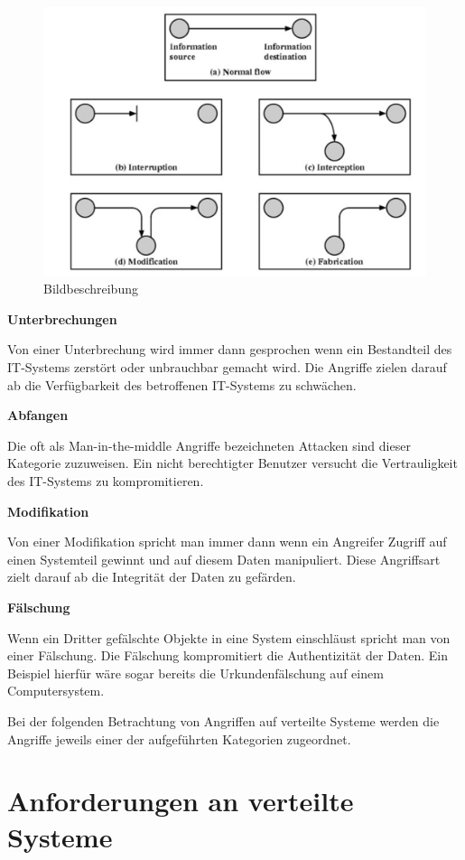 \begin{figure}[H]
    \centering
    \includegraphics[width=\textwidth]{images/angriffe_pic1.png}
    \caption[Beschriebung für Inhaltsverzeichnis]{Bildbeschreibung} 
    \label{Referenz}
\end{figure} 

\textbf{Unterbrechungen}

Von einer Unterbrechung wird immer dann gesprochen wenn ein Bestandteil des 
IT-Systems zerstört oder unbrauchbar gemacht wird. Die Angriffe zielen darauf 
ab die Verfügbarkeit des betroffenen IT-Systems zu schwächen. 

\textbf{Abfangen}

Die oft als \glqq Man-in-the-middle \grqq{} Angriffe bezeichneten Attacken sind dieser 
Kategorie zuzuweisen. Ein nicht berechtigter Benutzer versucht die Vertrauligkeit des 
IT-Systems zu kompromitieren.  

\textbf{Modifikation}

Von einer Modifikation spricht man immer dann wenn ein Angreifer Zugriff auf einen 
Systemteil gewinnt und auf diesem Daten manipuliert. Diese Angriffsart zielt 
darauf ab die Integrität der Daten zu gefärden. 

\textbf{Fälschung}

Wenn ein Dritter gefälschte Objekte in eine System einschläust spricht man von 
einer Fälschung. Die Fälschung kompromitiert die Authentizität der Daten. 
Ein Beispiel hierfür wäre sogar bereits die Urkundenfälschung auf einem Computersystem. 

Bei der folgenden Betrachtung von Angriffen auf verteilte Systeme werden die Angriffe jeweils einer 
der aufgeführten Kategorien zugeordnet. 





\section{Anforderungen an verteilte Systeme}



